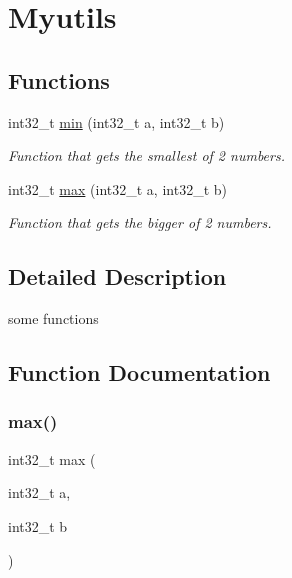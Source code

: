 \hypertarget{group__myutils}{}\section{Myutils}
\label{group__myutils}
\subsection*{Functions}
\begin{DoxyCompactItemize}
\item 
int32\+\_\+t \hyperlink{group__myutils_ga86fabf639ab773666d2c7936b104a668}{min} (int32\+\_\+t a, int32\+\_\+t b)
\begin{DoxyCompactList}\small\item\em Function that gets the smallest of 2 numbers. \end{DoxyCompactList}\item 
int32\+\_\+t \hyperlink{group__myutils_gad2cb7db3e303727f643020a668377947}{max} (int32\+\_\+t a, int32\+\_\+t b)
\begin{DoxyCompactList}\small\item\em Function that gets the bigger of 2 numbers. \end{DoxyCompactList}\end{DoxyCompactItemize}


\subsection{Detailed Description}
some functions 

\subsection{Function Documentation}
\mbox{\label{group__myutils_gad2cb7db3e303727f643020a668377947}} 
\subsubsection{\texorpdfstring{max()}{max()}}
{\footnotesize\ttfamily int32\+\_\+t max (\begin{DoxyParamCaption}\item[{int32\+\_\+t}]{a,  }\item[{int32\+\_\+t}]{b }\end{DoxyParamCaption})}



